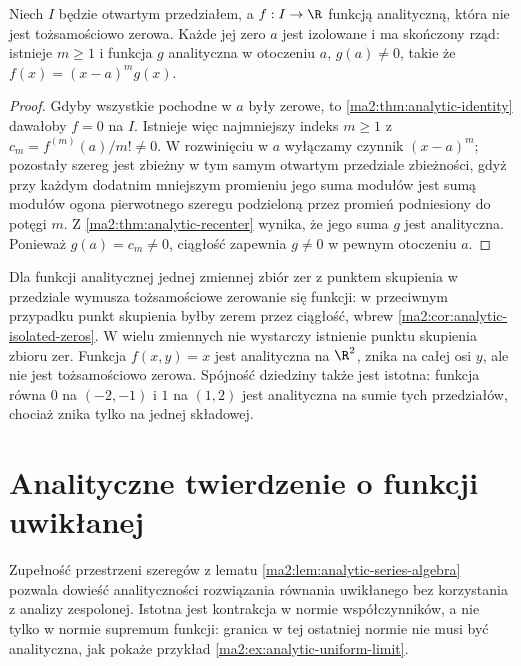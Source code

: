 \begin{wniosek}
\label{ma2:cor:analytic-isolated-zeros}
Niech $I$ będzie otwartym przedziałem,
a $f:I\to\R$ funkcją analityczną,
która nie jest tożsamościowo zerowa.
Każde jej zero $a$ jest izolowane i ma
skończony rząd: istnieje $m\ge1$ i funkcja
$g$ analityczna w otoczeniu $a$, $g(a)\ne0$,
takie że $f(x)=(x-a)^m g(x)$.
\end{wniosek}
\begin{proof}
Gdyby wszystkie pochodne w $a$ były zerowe,
to \ref{ma2:thm:analytic-identity} dawałoby
$f=0$ na $I$. Istnieje więc najmniejszy
indeks $m\ge1$ z $c_m=f^{(m)}(a)/m!\ne0$.
W rozwinięciu w $a$ wyłączamy czynnik
$(x-a)^m$; pozostały szereg jest zbieżny
w tym samym otwartym przedziale zbieżności,
gdyż przy każdym dodatnim mniejszym promieniu
jego suma modułów jest sumą modułów ogona
pierwotnego szeregu podzieloną przez
promień podniesiony do potęgi $m$.
Z \ref{ma2:thm:analytic-recenter} wynika,
że jego suma $g$ jest analityczna.
Ponieważ $g(a)=c_m\ne0$, ciągłość zapewnia
$g\ne0$ w pewnym otoczeniu $a$.
\end{proof}

\begin{przyklad}
\label{ma2:ex:analytic-identity-limitations}
Dla funkcji analitycznej jednej zmiennej
zbiór zer z punktem skupienia w przedziale
wymusza tożsamościowe zerowanie się funkcji:
w przeciwnym przypadku punkt skupienia
byłby zerem przez ciągłość, wbrew
\ref{ma2:cor:analytic-isolated-zeros}.
W wielu zmiennych nie wystarczy istnienie
punktu skupienia zbioru zer.
Funkcja $f(x,y)=x$ jest analityczna na $\R^2$,
znika na całej osi $y$, ale nie jest
tożsamościowo zerowa.
Spójność dziedziny także jest istotna:
funkcja równa $0$ na $(-2,-1)$ i $1$ na $(1,2)$
jest analityczna na sumie tych przedziałów,
chociaż znika tylko na jednej składowej.
\end{przyklad}

\section{Analityczne twierdzenie o funkcji uwikłanej}

Zupełność przestrzeni szeregów z lematu
\ref{ma2:lem:analytic-series-algebra}
pozwala dowieść analityczności rozwiązania
równania uwikłanego bez korzystania z analizy
zespolonej. Istotna jest kontrakcja w normie
współczynników, a nie tylko w normie supremum
funkcji: granica w tej ostatniej normie
nie musi być analityczna, jak pokaże przykład
\ref{ma2:ex:analytic-uniform-limit}.

